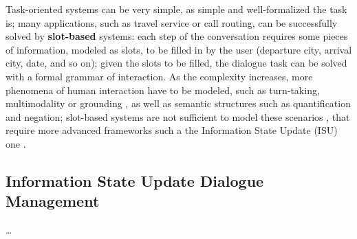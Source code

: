 Task-oriented systems can be very simple, as simple and well-formalized the task is;  many applications, such as travel service or call routing, can be successfully solved by \textbf{slot-based} systems: each step of the conversation requires some pieces of information, modeled as slots, to be filled in by the user (departure city, arrival city, date, and so on); given the slots to be filled, the dialogue task can be solved with a formal grammar of interaction. As the complexity increases, more phenomena of human interaction have to be modeled, such as turn-taking, multimodality or grounding
, as well as semantic structures such as quantification and negation; slot-based systems are not sufficient to model these scenarios \citep{Gabsdil03clarificationin}, that require more advanced frameworks such a the Information State Update (ISU) one \citep{TraumLarsson03p325}.

\subsection{Information State Update Dialogue Management}

\ldots
